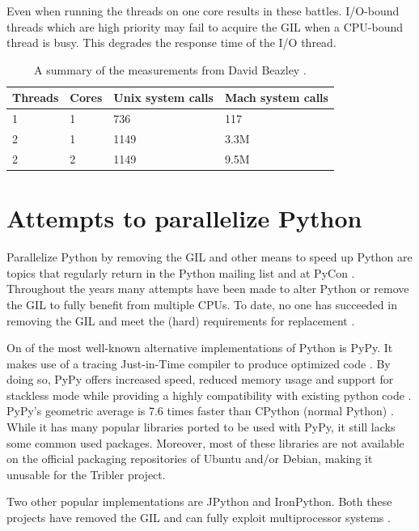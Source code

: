 Even when running the threads on one core results in these battles.
I/O-bound threads which are high priority may fail to acquire the GIL when a CPU-bound thread is busy.
This degrades the response time of the I/O thread.

\begin{table}[]
	\centering
	\begin{tabular}{|l|l|l|l|}
		\hline
	\textbf{Threads}	& \textbf{Cores} & \textbf{Unix system calls} & \textbf{Mach system calls} \\ \hline
	1	& 1 & 736 & 117 \\ \hline
	2	& 1 & 1149 & 3.3M \\ \hline
	2	& 2 & 1149 & 9.5M \\ \hline
	\end{tabular}
	\caption{A summary of the measurements from David Beazley \cite{beazley2009inside}.}
	\label{tbl:system_calls_thread_switching}
\end{table}

\section{Attempts to parallelize Python}
\label{sct:removing_the_gil}

Parallelize Python by removing the GIL and other means to speed up Python are topics that regularly return in the Python mailing list and at PyCon \cite{python2015global}.
Throughout the years many attempts have been made to alter Python or remove the GIL to fully benefit from multiple CPUs.
To date, no one has succeeded in removing the GIL and meet the (hard) requirements for replacement \cite{python2015global}.

On of the most well-known alternative implementations of Python is PyPy.
It makes use of a tracing Just-in-Time compiler to produce optimized code \cite{bolz2009tracing}.
By doing so, PyPy offers increased speed, reduced memory usage and support for stackless mode while providing a highly compatibility with existing python code \cite{pypy2016pypy}.
PyPy's geometric average is 7.6 times faster than CPython (normal Python) \cite{pypy2016speed}.
While it has many popular libraries ported to be used with PyPy, it still lacks some common used packages.
Moreover, most of these libraries are not available on the official packaging repositories of Ubuntu and/or Debian, making it unusable for the Tribler project.

Two other popular implementations are JPython and IronPython.
Both these projects have removed the GIL and can fully exploit multiprocessor systems \cite{python2015global}.

